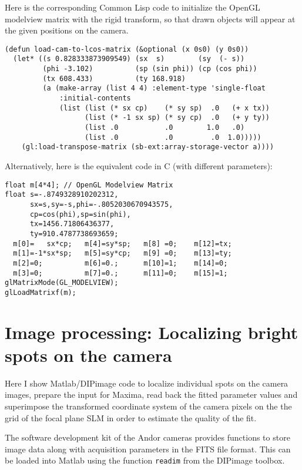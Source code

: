 Here is the corresponding Common Lisp code to initialize the OpenGL
modelview matrix with the rigid transform, so that drawn objects will
appear at the given positions on the camera.
\begin{lstlisting}[style=mylisp]
(defun load-cam-to-lcos-matrix (&optional (x 0s0) (y 0s0))
  (let* ((s 0.828333873909549) (sx  s)        (sy  (- s))
         (phi -3.102)          (sp (sin phi)) (cp (cos phi))
         (tx 608.433)          (ty 168.918)
         (a (make-array (list 4 4) :element-type 'single-float
             :initial-contents
             (list (list (* sx cp)    (* sy sp)  .0   (+ x tx))
                   (list (* -1 sx sp) (* sy cp)  .0   (+ y ty))
                   (list .0           .0        1.0   .0)
                   (list .0           .0         .0  1.0)))))
    (gl:load-transpose-matrix (sb-ext:array-storage-vector a))))    
\end{lstlisting}  
Alternatively, here is the equivalent code in C (with different
parameters):
\begin{lstlisting}[style=myclang]
float m[4*4]; // OpenGL Modelview Matrix
float s=-.8749328910202312,
      sx=s,sy=-s,phi=-.8052030670943575,
      cp=cos(phi),sp=sin(phi),
      tx=1456.71806436377,
      ty=910.4787738693659;
  m[0]=   sx*cp;   m[4]=sy*sp;   m[8] =0;    m[12]=tx; 
  m[1]=-1*sx*sp;   m[5]=sy*cp;   m[9] =0;    m[13]=ty; 
  m[2]=0;          m[6]=0.;      m[10]=1;    m[14]=0;  
  m[3]=0;          m[7]=0.;      m[11]=0;    m[15]=1;  
glMatrixMode(GL_MODELVIEW);
glLoadMatrixf(m);
\end{lstlisting}


\section{Image processing: Localizing bright spots on the camera}
\label{sec:matlab-spots}
Here I show Matlab/DIPimage code \citep{dipimage} to localize
individual spots on the camera images, prepare the input for Maxima,
read back the fitted parameter values and superimpose the transformed
coordinate system of the camera pixels on the the grid of the focal
plane SLM in order to estimate the quality of the fit.

The software development kit of the Andor cameras provides functions
to store image data along with acquisition parameters in the FITS file
format. This can be loaded into Matlab using the function
\verb!readim! from the DIPimage toolbox.


